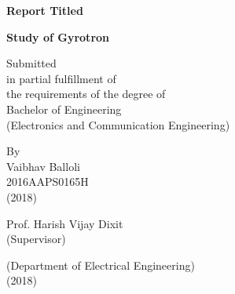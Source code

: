 \begin{titlepage}
	\thispagestyle{empty}
	\begin{center}
	\vspace*{1cm}
	
	\LARGE
	\textbf{Report Titled}
	
	\vspace{0.5cm}
	
	\Huge
	\textbf{Study of Gyrotron}
	
	\vspace{1.5cm}
	
	{\Large Submitted}\\
	{\Large in partial fulfillment of}\\
	{\Large the requirements of the degree of}\\
	[0.5cm]
	{\Large Bachelor of Engineering}\\
	{\Large (Electronics and Communication Engineering)}\\
	
	\vfill
	
	\Large
	By\\
	Vaibhav Balloli\\
	2016AAPS0165H\\
	\vspace{0.5cm}
	(2018)
	
	\vfill
	
	\Large
	Prof. Harish Vijay Dixit\\
	(Supervisor)
	
	\vfill
	
	\Large
	(Department of Electrical Engineering)\\
	(2018)
	
	
	\end{center}

\end{titlepage}